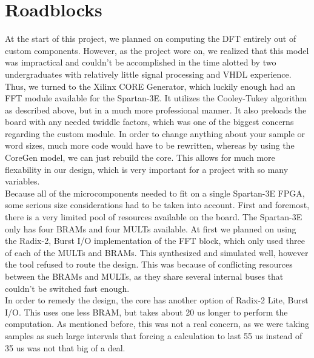 \documentclass[12pt]{article}
\begin{document}
  \section*{Roadblocks}
    At the start of this project, we planned on computing the DFT entirely out of custom components.
    However, as the project wore on, we realized that this model was impractical and couldn't be accomplished in the time alotted by two undergraduates with relatively little signal processing and VHDL experience.
    Thus, we turned to the Xilinx CORE Generator, which luckily enough had an FFT module available for the Spartan-3E.
    It utilizes the Cooley-Tukey algorithm as described above, but in a much more professional manner.
    It also preloads the board with any needed twiddle factors, which was one of the biggest concerns regarding the custom module.
    In order to change anything about your sample or word sizes, much more code would have to be rewritten, whereas by using the CoreGen model, we can just rebuild the core.
    This allows for much more flexability in our design, which is very important for a project with so many variables.\\

    Because all of the microcomponents needed to fit on a single Spartan-3E FPGA, some serious size considerations had to be taken into account.
    First and foremost, there is a very limited pool of resources available on the board.
    The Spartan-3E only has four BRAMs and four MULTs available.
    At first we planned on using the Radix-2, Burst I/O implementation of the FFT block, which only used three of each of the MULTs and BRAMs.
    This synthesized and simulated well, however the tool refused to route the design.
    This was because of conflicting resources between the BRAMs and MULTs, as they share several internal buses that couldn't be switched fast enough.\\
    
    In order to remedy the design, the core has another option of Radix-2 Lite, Burst I/O.
    This uses one less BRAM, but takes about 20 us longer to perform the computation.
    As mentioned before, this was not a real concern, as we were taking samples as such large intervals that forcing a calculation to last 55 us instead of 35 us was not that big of a deal.\\
\end{document}

